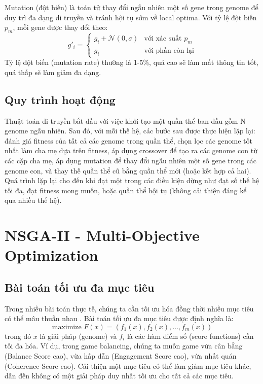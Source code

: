 Mutation (đột biến) là toán tử thay đổi ngẫu nhiên một số gene trong genome để duy trì đa dạng di truyền và tránh hội tụ sớm về local optima. Với tỷ lệ đột biến $p_m$, mỗi gene được thay đổi theo:
\begin{equation}
g'_i = \begin{cases}
g_i + \mathcal{N}(0, \sigma) & \text{với xác suất } p_m \\
g_i & \text{với phần còn lại}
\end{cases}
\end{equation}
Tỷ lệ đột biến (mutation rate) thường là 1-5\%, quá cao sẽ làm mất thông tin tốt, quá thấp sẽ làm giảm đa dạng.

\subsection{Quy trình hoạt động}

Thuật toán di truyền bắt đầu với việc khởi tạo một quần thể ban đầu gồm N genome ngẫu nhiên. Sau đó, với mỗi thế hệ, các bước sau được thực hiện lặp lại: đánh giá fitness của tất cả các genome trong quần thể, chọn lọc các genome tốt nhất làm cha mẹ dựa trên fitness, áp dụng crossover để tạo ra các genome con từ các cặp cha mẹ, áp dụng mutation để thay đổi ngẫu nhiên một số gene trong các genome con, và thay thế quần thể cũ bằng quần thể mới (hoặc kết hợp cả hai). Quá trình lặp lại cho đến khi đạt một trong các điều kiện dừng như đạt số thế hệ tối đa, đạt fitness mong muốn, hoặc quần thể hội tụ (không cải thiện đáng kể qua nhiều thế hệ).

\section{NSGA-II - Multi-Objective Optimization}

\subsection{Bài toán tối ưu đa mục tiêu}

Trong nhiều bài toán thực tế, chúng ta cần tối ưu hóa đồng thời nhiều mục tiêu có thể mâu thuẫn nhau \cite{zitzler2000comparison}. Bài toán tối ưu đa mục tiêu được định nghĩa là:
\begin{equation}
\text{maximize } F(x) = (f_1(x), f_2(x), \ldots, f_m(x))
\end{equation}
trong đó $x$ là giải pháp (genome) và $f_i$ là các hàm điểm số (score functions) cần tối đa hóa. Ví dụ, trong game balancing, chúng ta muốn game vừa cân bằng (Balance Score cao), vừa hấp dẫn (Engagement Score cao), vừa nhất quán (Coherence Score cao). Cải thiện một mục tiêu có thể làm giảm mục tiêu khác, dẫn đến không có một giải pháp duy nhất tối ưu cho tất cả các mục tiêu.

